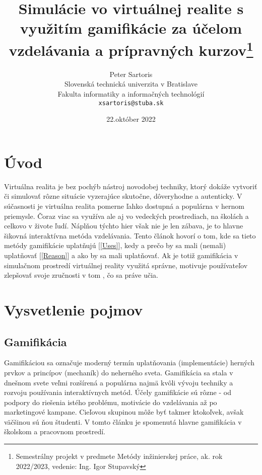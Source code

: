 \documentclass[10pt,slovak,a4paper]{article}
\title{Simulácie vo virtuálnej realite s využitím gamifikácie za účelom vzdelávania a prípravných kurzov\thanks{Semestrálny projekt v predmete Metódy inžinierskej práce, ak. rok 2022/2023, vedenie: Ing. Igor Stupavský}}
\author{Peter Sartoris\\[2pt]
	{\small Slovenská technická univerzita v Bratislave}\\
	{\small Fakulta informatiky a informačných technológií}\\
	{\small \texttt{xsartoris@stuba.sk}}
	}
\date{\small 22.október 2022}
\begin{document}
\maketitle


\section{Úvod} \label{Abstract}

Virtuálna realita je bez pochýb nástroj novodobej techniky, ktorý dokáže vytvoriť či simulovať rôzne situácie vyzerajúce skutočne, dôveryhodne a autenticky.
V súčasnosti je virtuálna realita pomerne ľahko dostupná a populárna v hernom priemysle. Čoraz viac sa využíva ale aj vo vedeckých prostrediach, na školách a celkovo v živote ľudí. 
Náplňou týchto hier však nie je len zábava, je to hlavne šikovná interaktívna metóda vzdelávania.
Tento článok hovorí o tom, kde sa tieto metódy gamifikácie uplatňujú [\ref{Uses}], kedy a prečo by sa mali (nemali) uplatňovať [\ref{Reason}] a ako by sa mali uplatňovať. %
Ak je totiž gamifikácia v simulačnom prostredí  virtuálnej reality využitá správne, motivuje používateľov zlepšovať svoje zručnosti v tom , čo sa práve učia.


\section{Vysvetlenie pojmov} \label{Terms}

\subsection{Gamifikácia} \label{Gamification:gamification}

Gamifikáciou sa označuje moderný termín uplatňovania (implementácie) herných prvkov a princípov (mechaník) do neherného sveta.
 Gamifikácia sa stala v dnešnom svete veľmi rozšírená a populárna najmä kvôli vývoju techniky a rozvoju používania interaktívnych metód.
Účely gamifikácie sú rôzne - od podpory do riešenia istého problému, motivácie do vzdelávania až po marketingové kampane. 
Cieľovou skupinou môže byť takmer ktokoľvek, avšak väčšinou sú ňou študenti. V tomto článku je spomenutá hlavne gamifikácia v školskom a pracovnom prostredí. \newline \newline
\end{document}
